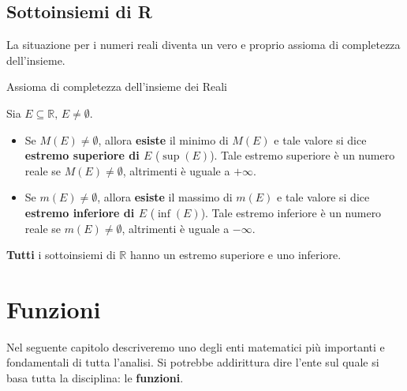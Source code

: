 \documentclass[12pt]{report}
\newcommand{\R}{\mathbb{R}}
\begin{document}
	\section{Sottoinsiemi di R}
	La situazione per i numeri reali diventa un vero e proprio assioma di completezza dell'insieme.
	\begin{teorema}{Assioma di completezza dell'insieme dei Reali}{}
		
		Sia $E \subseteq \R,\, E \neq \emptyset$.
		\begin{itemize}
			
			\item Se $M(E) \neq \emptyset$, allora \textbf{esiste} il minimo di $M(E)$ e tale valore si dice \textbf{estremo superiore di $E$} ($\operatorname{sup}(E)$). Tale estremo superiore è un numero reale se $M(E) \neq \emptyset$, altrimenti è uguale a $+\infty$.
			
			\item Se $m(E) \neq \emptyset$, allora \textbf{esiste} il massimo di $m(E)$ e tale valore si dice \textbf{estremo inferiore di $E$} ($\operatorname{inf}(E)$). Tale estremo inferiore è un numero reale se $m(E) \neq \emptyset$, altrimenti è uguale a $-\infty$.
			
		\end{itemize}
		
		\textbf{Tutti} i sottoinsiemi di $\R$ hanno un estremo superiore e uno inferiore.
	\end{teorema}

	\chapter{Funzioni}
	Nel seguente capitolo descriveremo uno degli enti matematici più importanti e fondamentali di tutta l'analisi. Si potrebbe addirittura dire l'ente sul quale si basa tutta la disciplina: le \textbf{funzioni}.
	
\end{document}
